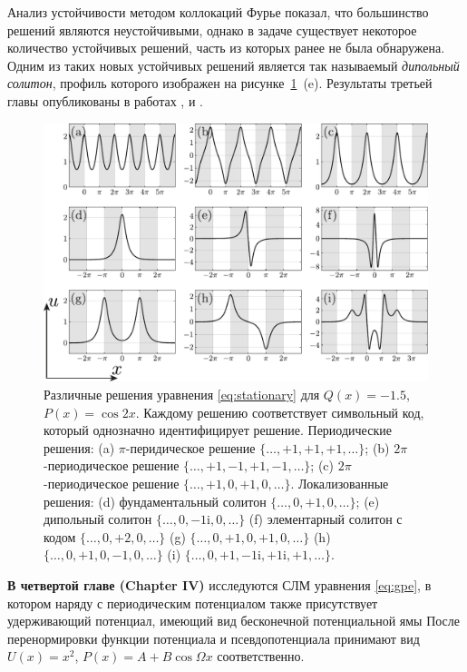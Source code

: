 \documentclass[candidate, href, colorlinks]{disser}
\begin{document}
Анализ устойчивости методом коллокаций Фурье показал, что большинство решений являются неустойчивыми, однако в задаче существует некоторое количество устойчивых решений, часть из которых ранее не была обнаружена.
Одним из таких новых устойчивых решений является так называемый {\it дипольный солитон}, профиль которого изображен на рисунке~\ref{fig:solutions}~(e).
Результаты третьей главы опубликованы в работах \cite{LebedevAlfimovMalomed}, \cite{NizhniNovgorod2016} и \cite{Tashkent2018}.

\begin{figure}[h!]
\centering
	\includegraphics[scale = 1]{../pic/solutions for cosine equation}
	\caption{
		Различные решения уравнения \eqref{eq:stationary} для $Q(x) = -1.5$, $P(x) = \cos 2x$.
		Каждому решению соответствует символьный код, который однозначно идентифицирует решение.
		Периодические решения: (a) $\pi$-перидическое решение $\{ \dots, +1, +1, +1, \dots \}$; (b) $2 \pi$-периодическое решение $\{ \dots, +1, -1, +1, -1, \dots \}$; (c) $2 \pi$-периодическое решение $\{ \dots, +1, 0, +1, 0, \dots \}$.
		Локализованные решения: (d) фундаментальный солитон $\{ \dots, 0, +1, 0, \dots \}$; (e) дипольный солитон $\{ \dots, 0, -1\mathrm{i}, 0, \dots \}$ (f) элементарный солитон с кодом $\{ \dots, 0, +2, 0, \dots \}$ (g) $\{ \dots, 0, +1, 0, +1, 0, \dots \}$ (h) $\{ \dots, 0, +1, 0, -1, 0, \dots \}$ (i) $\{ \dots, 0, +1, -1\mathrm{i}, +1\mathrm{i}, +1, \dots \}$.
	}
\label{fig:solutions}
\end{figure}

\textbf{В четвертой главе (Chapter IV)} исследуются СЛМ уравнения \eqref{eq:gpe}, в котором наряду с периодическим потенциалом также присутствует удерживающий потенциал, имеющий вид бесконечной потенциальной ямы
После перенормировки функции потенциала и псевдопотенциала принимают вид $U(x) = x^2$, $P(x) = A + B \cos \Omega x$ соответственно.
\end{document}
